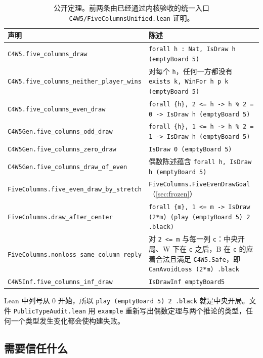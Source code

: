 \documentclass[11pt,a4paper]{article}
\theoremstyle{zhthm}
\newcommand{\code}[1]{{\upshape\texttt{\small\nolinkurl{#1}}}}
\newcommand{\B}{\mathrm{B}}
\newcommand{\W}{\mathrm{W}}
\newcommand{\lst}[1]{{\upshape\frenchspacing\texttt{\small #1}}}
\begin{document}
\begin{table}[!htbp]
\centering
\caption{公开定理。前两条由已经通过内核验收的统一入口 \code{C4W5/FiveColumnsUnified.lean} 证明。}
\label{tab:public}
\small
\begin{tabularx}{\linewidth}{@{}l Y@{}}
\toprule
\textbf{声明} & \textbf{陈述} \\
\midrule
\code{C4W5.five_columns_draw} & \lst{forall h : Nat, IsDraw h (emptyBoard 5)} \\
\code{C4W5.five_columns_neither_player_wins} & 对每个 \lst{h}，任何一方都没有 \lst{exists k, WinFor h p k (emptyBoard 5)} \\
\code{C4W5.five_columns_even_draw} & \lst{forall \{h\}, 2 <= h -> h \% 2 = 0 -> IsDraw h (emptyBoard 5)} \\
\code{C4W5Gen.five_columns_odd_draw} & \lst{forall \{h\}, 1 <= h -> h \% 2 = 1 -> IsDraw h (emptyBoard 5)} \\
\code{C4W5Gen.five_columns_zero_draw} & \lst{IsDraw 0 (emptyBoard 5)} \\
\code{C4W5Gen.five_columns_draw_of_even} & 偶数陈述蕴含 \lst{forall h, IsDraw h (emptyBoard 5)} \\
\code{FiveColumns.five_even_draw_by_stretch} & \lst{FiveColumns.FiveEvenDrawGoal}（\cref{sec:frozen}） \\
\code{FiveColumns.draw_after_center} & \lst{forall \{m\}, 1 <= m -> IsDraw (2*m) (play (emptyBoard 5) 2 .black)} \\
\code{FiveColumns.nonloss_same_column_reply} & 对 \lst{2 <= m} 与每一列 \lst{c}：中央开局、$\W$ 下在 \lst{c} 之后，$\B$ 在 \lst{c} 的应着合法且满足 \lst{C4W5.Safe}，即 \lst{CanAvoidLoss (2*m) .black} \\
\code{C4W5Inf.five_columns_inf_draw} & \lst{IsDrawInf emptyBoard5} \\
\bottomrule
\end{tabularx}
\end{table}

Lean 中列号从 $0$ 开始，所以 \code{play (emptyBoard 5) 2 .black} 就是中央开局。文件 \code{PublicTypeAudit.lean} 用 \code{example} 重新写出偶数定理与两个推论的类型，任何一个类型发生变化都会使构建失败。

\subsection{需要信任什么}
\label{sec:tcb}
\end{document}

